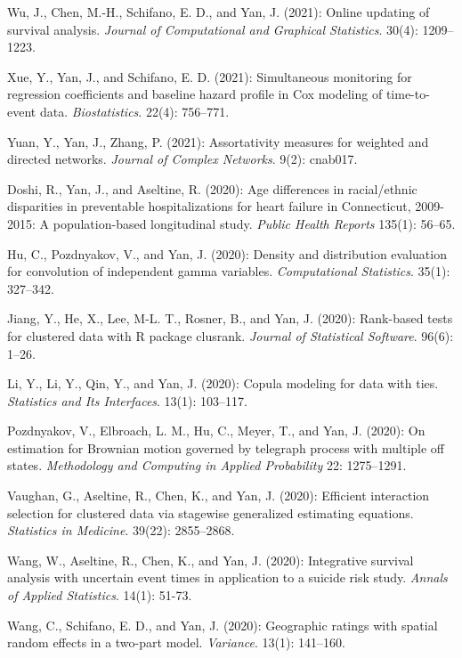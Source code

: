 \documentclass[Statistics]{vita}
\begin{document}
\begin{vita}
\begin{Publications}
\begin{RefereedJournalArticles}
  \item *Wu, J., Chen, M.-H., Schifano, E. D., and Yan, J. (2021): Online updating of survival analysis. {\em Journal of Computational and Graphical Statistics\/}. 30(4): 1209--1223.
  \item *Xue, Y., Yan, J., and Schifano, E. D. (2021): Simultaneous monitoring for regression coefficients and baseline hazard profile in Cox modeling of time-to-event data. {\em Biostatistics\/}. 22(4): 756--771.
  \item *Yuan, Y., Yan, J., Zhang, P. (2021): Assortativity measures for weighted and directed networks. {\em Journal of Complex Networks\/}. 9(2): cnab017. 
  \item *Doshi, R., Yan, J., and Aseltine, R. (2020): Age differences in racial/ethnic disparities in preventable hospitalizations for heart failure in Connecticut, 2009-2015: A population-based longitudinal study. {\em Public Health Reports\/} 135(1): 56--65.
  \item *Hu, C., Pozdnyakov, V., and Yan, J. (2020): Density and distribution evaluation for convolution of independent gamma variables. {\em Computational Statistics\/}. 35(1): 327--342.
  \item *Jiang, Y., He, X., Lee, M-L. T., Rosner, B., and Yan, J. (2020): Rank-based tests for clustered data with R package clusrank. {\em Journal of Statistical Software\/}. 96(6): 1--26.
  \item *Li, Y., Li, Y., Qin, Y., and Yan, J. (2020): Copula modeling for data with ties.  {\em Statistics and Its Interfaces\/}. 13(1): 103--117.
  \item Pozdnyakov, V., Elbroach, L. M., Hu, C., Meyer, T., and Yan, J. (2020): On estimation for Brownian motion governed by telegraph process with multiple off states. {\em Methodology and Computing in Applied Probability\/} 22: 1275--1291.
  \item *Vaughan, G., Aseltine, R., Chen, K., and Yan, J. (2020): Efficient interaction selection for clustered data via stagewise generalized estimating equations. {\em Statistics in Medicine\/}. 39(22): 2855--2868.
  \item *Wang, W., Aseltine, R., Chen, K., and Yan, J. (2020): Integrative survival analysis with uncertain event times in application to a suicide risk study. {\em Annals of Applied Statistics\/}. 14(1): 51-73.      
  \item *Wang, C., Schifano, E. D., and Yan, J. (2020): Geographic ratings with spatial random effects in a two-part model. {\em Variance\/}. 13(1): 141--160.

\end{RefereedJournalArticles}
\end{Publications}
\end{vita}
\end{document}
